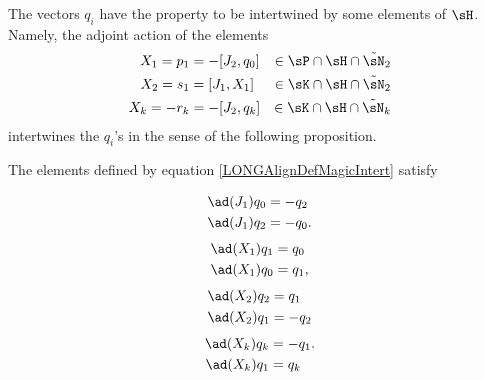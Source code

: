 The vectors $q_i$ have the property to be intertwined by some elements of $\sH$. Namely, the adjoint action of the elements
%
\begin{subequations}\label{LONGAlignDefMagicIntert}
	\begin{align}
		X_1=p_1  & =-[J_2,q_0] & \in\sP\cap\sH\cap\tilde\sN_2                                 \\
		X_2=s_1  & =[J_1,X_1]  & \in\sK\cap\sH\cap\tilde\sN_2                                 \\
		X_k=-r_k & =-[J_2,q_k] & \in\sK\cap\sH\cap\tilde\sN_k				\label{LONGEqDefXkCommeComm}
	\end{align}
\end{subequations}%
%
intertwines the $q_i$'s in the sense of the following proposition.
%
\begin{proposition}			\label{LONGXUnALaTwistingSuperCool}
	The elements defined by equation \eqref{LONGAlignDefMagicIntert} satisfy
	\begin{multicols}{2}
		\begin{subequations}				\label{LONGEqCalculBBBJUnUnNirme}
			\begin{align}
				\ad(J_1)q_0 & =-q_2		\label{LONGEqCalculBBBJUnUnNirmeA}  \\
				\ad(J_1)q_2 & =-q_0.		\label{LONGEqCalculBBBJUnUnNirmeB}
			\end{align}
		\end{subequations}
		\begin{subequations}				\label{LONGEqSubEqbXUnqZero}
			\begin{align}
				\ad(X_1)q_1 & =q_0		\label{LONGSubEqbXZeroqUn}  \\
				\ad(X_1)q_0 & =q_1,		\label{LONGSubEqbXUnqZero}
			\end{align}
		\end{subequations}
		\begin{subequations}
			\begin{align}
				\ad(X_2)q_2 & =q_1		\label{LONGSubEqXdeuxQdeuxa} \\
				\ad(X_2)q_1 & =-q_2		\label{LONGSubEqXdeuxQun}
			\end{align}
		\end{subequations}
		\begin{subequations}				\label{LONGEqSubEqbXkqZero}
			\begin{align}
				\ad(X_k)q_k & =-q_1.		\label{LONGSubEqbXIMoinsqZero} \\
				\ad(X_k)q_1 & =q_k		\label{LONGSubEqbXkQunQk}
			\end{align}
		\end{subequations}
	\end{multicols}
\end{proposition}


